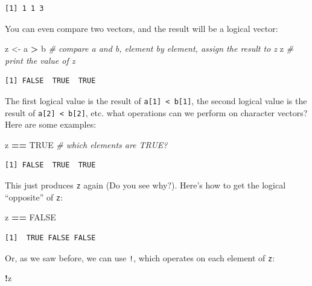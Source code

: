 \documentclass[
]{book}
\newenvironment{Shaded}{\begin{snugshade}}{\end{snugshade}}
\newcommand{\CommentTok}[1]{\textcolor[rgb]{0.56,0.35,0.01}{\textit{#1}}}
\newcommand{\NormalTok}[1]{#1}
\newcommand{\OperatorTok}[1]{\textcolor[rgb]{0.81,0.36,0.00}{\textbf{#1}}}
\newcommand{\OtherTok}[1]{\textcolor[rgb]{0.56,0.35,0.01}{#1}}
\newcommand{\StringTok}[1]{\textcolor[rgb]{0.31,0.60,0.02}{#1}}
\begin{document}
\begin{verbatim}
[1] 1 1 3
\end{verbatim}

You can even compare two vectors, and the result will be a logical vector:

\begin{Shaded}
\begin{Highlighting}[]
\NormalTok{z <-}\StringTok{ }\NormalTok{a }\OperatorTok{>}\StringTok{ }\NormalTok{b   }\CommentTok{# compare a and b, element by element, assign the result to z}
\NormalTok{z            }\CommentTok{# print the value of z}
\end{Highlighting}
\end{Shaded}

\begin{verbatim}
[1] FALSE  TRUE  TRUE
\end{verbatim}

The first logical value is the result of \texttt{a{[}1{]}\ \textless{}\ b{[}1{]}}, the second logical value is the result of \texttt{a{[}2{]}\ \textless{}\ b{[}2{]}}, etc.
what operations can we perform on character vectors?
Here are some examples:

\begin{Shaded}
\begin{Highlighting}[]
\NormalTok{z }\OperatorTok{==}\StringTok{ }\OtherTok{TRUE}   \CommentTok{# which elements are TRUE?}
\end{Highlighting}
\end{Shaded}

\begin{verbatim}
[1] FALSE  TRUE  TRUE
\end{verbatim}

This just produces \texttt{z} again (Do you see why?).
Here's how to get the logical ``opposite'' of \texttt{z}:

\begin{Shaded}
\begin{Highlighting}[]
\NormalTok{z }\OperatorTok{==}\StringTok{ }\OtherTok{FALSE}
\end{Highlighting}
\end{Shaded}

\begin{verbatim}
[1]  TRUE FALSE FALSE
\end{verbatim}

Or, as we saw before, we can use \texttt{!}, which operates on each element of \texttt{z}:

\begin{Shaded}
\begin{Highlighting}[]
\OperatorTok{!}\NormalTok{z}
\end{Highlighting}
\end{Shaded}
\end{document}
